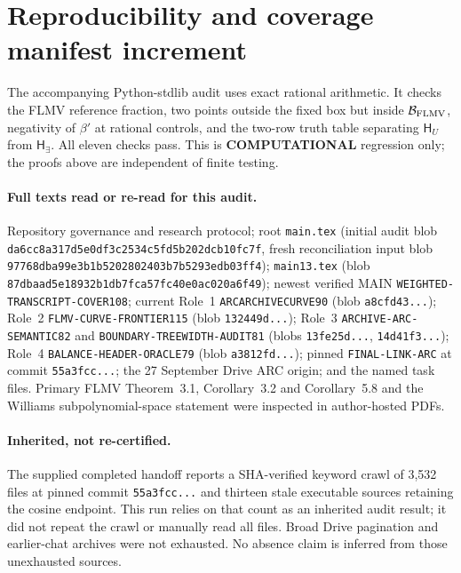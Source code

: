 \documentclass[11pt]{article}
\newcommand{\BB}{\mathcal B_{\rm FLMV}}
\begin{document}
\section{Reproducibility and coverage manifest increment}

The accompanying Python-stdlib audit uses exact rational arithmetic.  It
checks the FLMV reference fraction, two points outside the fixed box but
inside $\BB$, negativity of $\beta'$ at rational controls, and the two-row
truth table separating $\mathsf H_U$ from $\mathsf H_{\exists}$.  All eleven
checks pass.  This is \textbf{COMPUTATIONAL} regression only; the proofs above
are independent of finite testing.

\paragraph{Full texts read or re-read for this audit.}
Repository governance and research protocol; root \texttt{main.tex}
(initial audit blob \texttt{da6cc8a317d5e0df3c2534c5fd5b202dcb10fc7f},
fresh reconciliation input blob
\texttt{97768dba99e3b1b5202802403b7b5293edb03ff4});
\texttt{main13.tex} (blob
\texttt{87dbaad5e18932b1db7fca57fc40e0ac020a6f49}); newest verified MAIN
\texttt{WEIGHTED-TRANSCRIPT-COVER108}; current Role~1
\texttt{ARCARCHIVECURVE90} (blob \texttt{a8cfd43...}); Role~2
\texttt{FLMV-CURVE-FRONTIER115} (blob \texttt{132449d...}); Role~3
\texttt{ARCHIVE-ARC-SEMANTIC82} and \texttt{BOUNDARY-TREEWIDTH-AUDIT81}
(blobs \texttt{13fe25d...}, \texttt{14d41f3...}); Role~4
\texttt{BALANCE-HEADER-ORACLE79} (blob \texttt{a3812fd...}); pinned
\texttt{FINAL-LINK-ARC} at commit \texttt{55a3fcc...}; the 27 September
Drive ARC origin; and the named task files.  Primary FLMV Theorem~3.1,
Corollary~3.2 and Corollary~5.8 and the Williams subpolynomial-space statement
were inspected in author-hosted PDFs.

\paragraph{Inherited, not re-certified.}
The supplied completed handoff reports a SHA-verified keyword crawl of 3,532
files at pinned commit \texttt{55a3fcc...} and thirteen stale executable
sources retaining the cosine endpoint.  This run relies on that count as an
inherited audit result; it did not repeat the crawl or manually read all files.
Broad Drive pagination and earlier-chat archives were not exhausted.  No
absence claim is inferred from those unexhausted sources.
\end{document}
